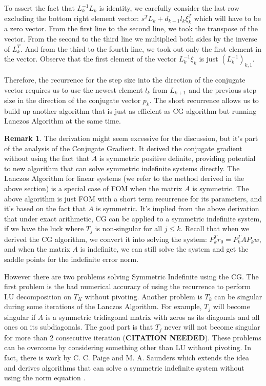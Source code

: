 \documentclass[]{article}
\theoremstyle{definition}
\newtheorem{remark}{Remark}[subsection]  %
\begin{document}
            To assert the fact that $L_k^{-1}L_k$ is identity, we carefully consider the last row excluding the bottom right element vector: $s^TL_k + d_{k + 1}l_k\xi_k^T$ which will have to be a zero vector. From the first line to the second line, we took the transpose of the vector. From the second to the third line we multiplied both sides by the inverse of $L_k^{T}$. And from the third to the fourth line, we took out only the first element in the vector. Observe that the first element of the vector $L_k^{-1}\xi_k$ is just $(L_k^{-1})_{k, 1}$. 
            \par
            Therefore, the recurrence for the step size into the direction of the conjugate vector requires us to use the newest element $l_k$ from $L_{k + 1}$ and the previous step size in the direction of the conjugate vector $p_k$. The short recurrence allows us to build up another algorithm that is just as efficient as CG algorithm but running Lanczos Algorithm at the same time. 
            \begin{remark}
                The derivation might seem excessive for the discussion, but it's part of the analysis of the Conjugate Gradient. It derived the conjugate gradient without using the fact that $A$ is symmetric positive definite, providing potential to new algorithm that can solve symmetric indefinite systems directly. The Lanczos Algorithm for linear systems (we refer to the method derived in the above section) is a special case of FOM \cite{paper:FOM} when the matrix $A$ is symmetric. The above algorithm is just FOM with a short term recurrence for its parameters, and it's based on the fact that $A$ is symmetric. It's implied from the above derivation that under exact arithmetic, CG can be applied to a symmetric indefinite system, if we have the luck where $T_j$ is non-singular for all $j\le k$. Recall that when we derived the CG algorithm, we convert it into solving the system: $P^T_kr_0 = P_k^TAP_kw$, and when the matrix $A$ is indefinite, we can still solve the system and get the saddle points for the indefinite error norm. 
                \par
                However there are two problems solving Symmetric Indefinite using the CG. The first problem is the bad numerical accuracy of using the recurrence to perform LU decomposition on $T_K$ without pivoting. Another problem is $T_k$ can be singular during some iterations of the Lanczos Algorithm. For example, $T_j$ will become singular if $A$ is a symmetric tridiagonal matrix with zeros as its diagonals and all ones on its subdiagonals. The good part is that $T_j$ never will not become singular for more than 2 consecutive iteration (\textbf{CITATION NEEDED}). These problems can be overcome by considering something other than LU without pivoting. In fact, there is work by C. C. Paige and M. A. Saunders which extends the idea and derives algorithms that can solve a symmetric indefinite system without using the norm equation \cite{paper:SYMLQ}. 
            \end{remark}
        
\end{document}
